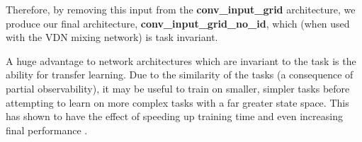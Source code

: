 Therefore, by removing this input from the \textbf{conv\_input\_grid} architecture, we produce our final architecture, \textbf{conv\_input\_grid\_no\_id}, which (when used with the VDN mixing network) is task invariant.




A huge advantage to network architectures which are invariant to the task is the ability for transfer learning. Due to the similarity of the tasks (a consequence of partial observability), it may be useful to train on smaller, simpler tasks before attempting to learn on more complex tasks with a far greater state space. This has shown to have the effect of speeding up training time and even increasing final performance \cite{curriculum}.



